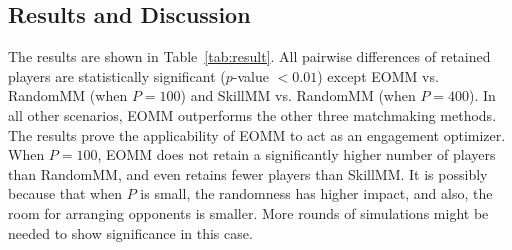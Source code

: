 





\subsection{Results and Discussion}

The results are shown in Table~\ref{tab:result}. All pairwise differences of retained players are statistically significant ($p$-value $< 0.01$) except EOMM vs.\! RandomMM (when $P=100$) and SkillMM vs.\! RandomMM (when $P=400$). In all other scenarios, EOMM outperforms the other three matchmaking methods. The results prove the applicability of EOMM to act as an engagement optimizer. When $P=100$, EOMM does not retain a significantly higher number of players than RandomMM, and even retains fewer players than SkillMM. It is possibly because that when $P$ is small, the randomness has higher impact, and also, the room for arranging opponents is smaller. More rounds of simulations might be needed to show significance in this case.

